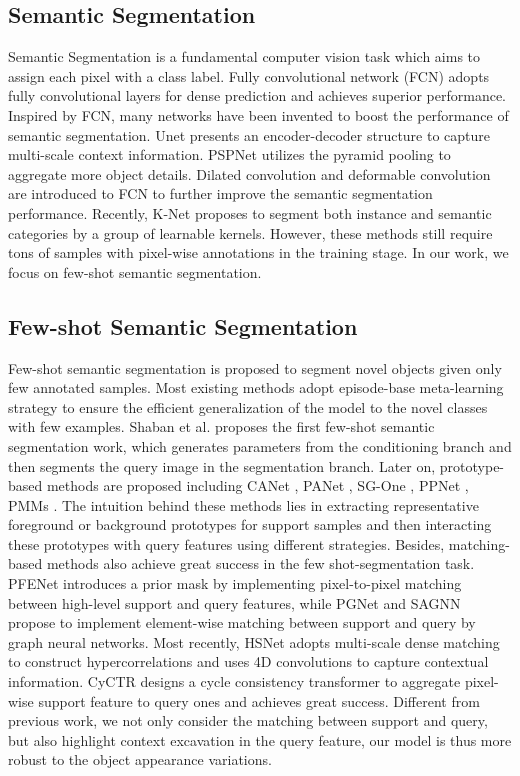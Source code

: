 \documentclass{bmvc2k}
\begin{document}
\subsection{Semantic Segmentation} 
Semantic Segmentation is a fundamental computer vision task which aims to assign each pixel with a class label. Fully convolutional network (FCN) \cite{long2015fully} adopts fully convolutional layers for dense prediction and achieves superior performance. Inspired by FCN, many networks have been invented to boost the performance of semantic segmentation. Unet \cite{ronneberger2015u} presents an encoder-decoder structure to capture multi-scale context information. PSPNet \cite{zhao2017pyramid} utilizes  the pyramid pooling to aggregate more object details. Dilated convolution \cite{yu2015multi} and deformable convolution \cite{dai2017deformable} are introduced to FCN to further improve the semantic segmentation performance. Recently,  K-Net \cite{zhang2021k} proposes to segment both instance and semantic categories by a group of learnable kernels.  However, these methods still require tons of samples with pixel-wise annotations in the training stage. In our work, we focus on few-shot semantic segmentation.
\subsection{Few-shot Semantic Segmentation}
Few-shot semantic segmentation is proposed to segment novel objects given only few annotated samples. Most existing methods adopt episode-base meta-learning \cite{xie2021scale} strategy to ensure the efficient generalization of the model to the novel classes with few examples. Shaban et al. \cite{shaban2017one} proposes the first few-shot semantic segmentation work, which generates parameters from the conditioning branch and then segments the query image in the segmentation branch. Later on, prototype-based methods are proposed including CANet \cite{Zhang_2019_CVPR}, PANet \cite{wang2019panet}, SG-One \cite{zhang2020sg}, PPNet \cite{liu2020part}, PMMs \cite{yang2020prototype}. The intuition behind these methods lies in extracting representative foreground or background prototypes for support samples and then interacting these prototypes with query features using different strategies. Besides, matching-based methods \cite{tian2020prior, zhang2019pyramid, xie2021scale,min2021hypercorrelation, zhang2021few} also achieve great success in the few shot-segmentation task. PFENet \cite{tian2020prior} introduces a prior mask by implementing pixel-to-pixel matching between high-level support and query features, while PGNet \cite{zhang2019pyramid} and SAGNN \cite{xie2021scale} propose to implement element-wise matching between support and query by graph neural networks. Most recently, HSNet \cite{min2021hypercorrelation} adopts multi-scale dense matching to construct hypercorrelations and uses 4D convolutions to capture contextual information.  CyCTR \cite{zhang2021few} designs a cycle consistency transformer to aggregate pixel-wise support feature to query ones and achieves great success.  Different from previous work, we not only consider the matching between support and query, but also highlight context excavation in the query feature, our model is thus more robust to the object appearance variations.
\end{document}
